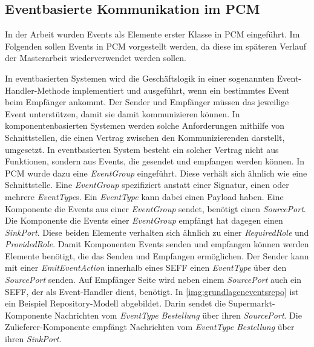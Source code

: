 \subsection{Eventbasierte Kommunikation im PCM}
In der Arbeit \cite{Rathfelder2013} wurden Events als Elemente erster Klasse in PCM eingeführt. Im Folgenden sollen Events in PCM vorgestellt werden, da diese im späteren Verlauf der Masterarbeit wiederverwendet werden sollen. \par
In eventbasierten Systemen wird die Geschäftslogik in einer sogenannten Event-Handler-Methode implementiert und ausgeführt, wenn ein bestimmtes Event beim Empfänger ankommt. Der Sender und Empfänger müssen das jeweilige Event unterstützen, damit sie damit kommunizieren können. In komponentenbasierten Systemen werden solche Anforderungen mithilfe von Schnittstellen, die einen Vertrag zwischen den Kommunizierenden darstellt, umgesetzt. In eventbasierten System besteht ein solcher Vertrag nicht aus Funktionen, sondern aus Events, die gesendet und empfangen werden können. In PCM wurde dazu eine \emph{EventGroup} eingeführt. Diese verhält sich ähnlich wie eine Schnittstelle. Eine \emph{EventGroup} spezifiziert anstatt einer Signatur, einen oder mehrere \emph{EventType}s. Ein \emph{EventType} kann dabei einen Payload haben. Eine Komponente die Events aus einer \emph{EventGroup} sendet, benötigt einen \emph{SourcePort}. Die Komponente die Events einer \emph{EventGroup} empfängt hat dagegen einen \emph{SinkPort}. Diese beiden Elemente verhalten sich ähnlich zu einer \emph{RequiredRole} und \emph{ProvidedRole}. 
Damit Komponenten Events senden und empfangen können werden Elemente benötigt, die das Senden und Empfangen ermöglichen. Der Sender kann mit einer \emph{EmitEventAction} innerhalb eines SEFF einen \emph{EventType} über den \emph{SourcePort} senden. Auf Empfänger Seite wird neben einem \emph{SourcePort} auch ein SEFF, der als Event-Handler dient, benötigt. In \autoref{img:grundlageneventsrepo} ist ein Beispiel Repository-Modell abgebildet. Darin sendet die Supermarkt-Komponente Nachrichten vom \emph{EventType} \emph{Bestellung} über ihren \emph{SourcePort}. Die Zulieferer-Komponente empfängt Nachrichten vom \emph{EventType} \emph{Bestellung} über ihren \emph{SinkPort}.

